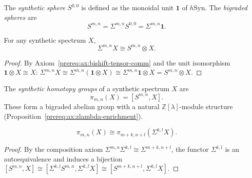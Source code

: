 \begin{definition}\label{prereq:def:bigraded-spheres}
    \leanok
    The \emph{synthetic sphere} $S^{0,0}$ is defined as the monoidal unit $\mathbf{1}$ of $h\mathrm{Syn}$. The \emph{bigraded spheres} are
    $$S^{m,n} = \Sigma^{m,n} S^{0,0} = \Sigma^{m,n}\mathbf{1}.$$
\end{definition}

\begin{proposition}\label{prereq:prop:bishift-tensor-sphere}
    \leanok
    For any synthetic spectrum $X$,
    $$\Sigma^{m,n}X \cong S^{m,n} \otimes X.$$
\end{proposition}
\begin{proof}
    By Axiom~\ref{prereq:ax:bishift-tensor-comm} and the unit isomorphism $\mathbf{1} \otimes X \cong X$:
    $\Sigma^{m,n}X \cong \Sigma^{m,n}(\mathbf{1} \otimes X) \cong \Sigma^{m,n}\mathbf{1} \otimes X = S^{m,n} \otimes X$.
\end{proof}

\begin{definition}\label{prereq:def:synthetic-homotopy-groups}
    \leanok
    The \emph{synthetic homotopy groups} of a synthetic spectrum $X$ are
    $$\pi_{m,n}(X) = [S^{m,n}, X].$$
    These form a bigraded abelian group with a natural $\mathbb{Z}[\lambda]$-module structure (Proposition~\ref{prereq:ax:zlambda-enrichment}).
\end{definition}

\begin{proposition}\label{prereq:prop:synthetic-homotopy-shift}
    \leanok
    $$\pi_{m,n}(X) \cong \pi_{m+k,n+l}(\Sigma^{k,l}X).$$
\end{proposition}
\begin{proof}
    By the composition axiom $\Sigma^{m,n}\Sigma^{k,l} \cong \Sigma^{m+k,n+l}$, the functor $\Sigma^{k,l}$ is an autoequivalence and induces a bijection $[S^{m,n}, X] \cong [\Sigma^{k,l}S^{m,n}, \Sigma^{k,l}X] \cong [S^{m+k,n+l}, \Sigma^{k,l}X]$.
\end{proof}

